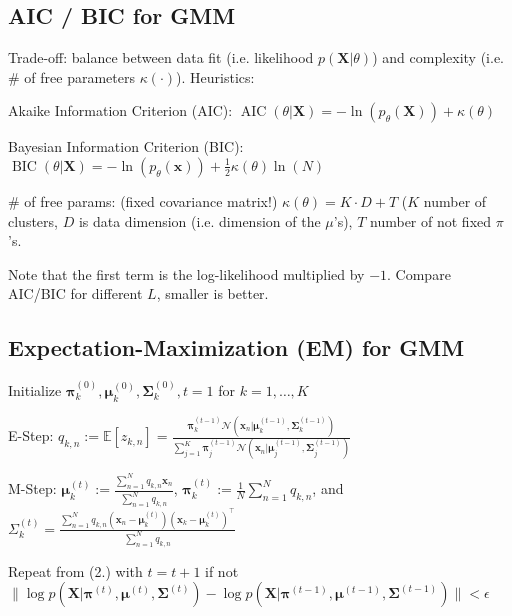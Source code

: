\documentclass[a4paper, 11pt, landscape]{article}
\begin{document}
\begin{multicols*}{3}
\subsection{AIC / BIC for GMM}
Trade-off: balance between data fit (i.e. likelihood $p(\mathbf{X} | \theta)$) and complexity (i.e. \# of free parameters $\kappa(\cdot)$). Heuristics:
\begin{compactdesc}
	\item[Akaike Information Criterion (AIC):] $\operatorname{AIC}(\theta | \mathbf{X}) = -\ln(p_\theta(\mathbf{X})) + \kappa(\theta)$
	\item[Bayesian Information Criterion (BIC):] $\operatorname{BIC}(\theta | \mathbf{X}) = -\ln(p_\theta(\mathbf{x})) + \frac{1}{2} \kappa(\theta) \ln(N)$
	\item[\# of free params:] (fixed covariance matrix!) $\kappa(\theta) = K \cdot D + T$ ($K$ number of clusters, $D$ is data dimension (i.e. dimension of the $\mu$'s), $T$ number of not fixed $\pi$'s.
\end{compactdesc}
Note that the first term is the log-likelihood multiplied by $-1$. Compare AIC/BIC for different $L$, smaller is better.


\subsection{Expectation-Maximization (EM) for GMM}
\begin{compactenum}
	\item Initialize $\boldsymbol{\pi}_k^{(0)}, \boldsymbol{\mu}_k^{(0)}, \boldsymbol{\Sigma}_k^{(0)}, t = 1$ for $k = 1, \ldots, K$
	\item E-Step: $q_{k,n} := \mathbb{E}[z_{k,n}] = \frac{\boldsymbol{\pi}_k^{(t-1)} \mathcal{N}(\mathbf{x}_n | \boldsymbol{\mu}_k^{(t-1)}, \boldsymbol{\Sigma}_k^{(t-1)})}{\sum_{j=1}^K \boldsymbol{\pi}_j^{(t-1)} \mathcal{N}(\mathbf{x}_n | \boldsymbol{\mu}_j^{(t-1)}, \boldsymbol{\Sigma}_j^{(t-1)})}$
	\item M-Step: $\boldsymbol{\mu}_k^{(t)} := \frac{\sum_{n=1}^N q_{k,n} \mathbf{x}_n}{\sum_{n=1}^N q_{k,n}}$, $\boldsymbol{\pi}_k^{(t)} := \frac{1}{N} \sum_{n=1}^N q_{k,n}$, and $\Sigma_k^{(t)} = \frac{\sum_{n=1}^N q_{k, n} (\mathbf{x}_n - \boldsymbol{\mu}_k^{(t)})(\mathbf{x}_k - \boldsymbol{\mu}_k^{(t)})^\top}{\sum_{n=1}^N q_{k,n}}$
	\item Repeat from (2.) with $t = t + 1$ if not $\| \log p(\mathbf{X} | \boldsymbol{\pi}^{(t)}, \boldsymbol{\mu}^{(t)}, \boldsymbol{\Sigma}^{(t)}) - \log p(\mathbf{X} | \boldsymbol{\pi}^{(t-1)}, \boldsymbol{\mu}^{(t-1)}, \boldsymbol{\Sigma}^{(t-1)}) \| < \epsilon$
\end{compactenum}


\end{multicols*}
\end{document}
